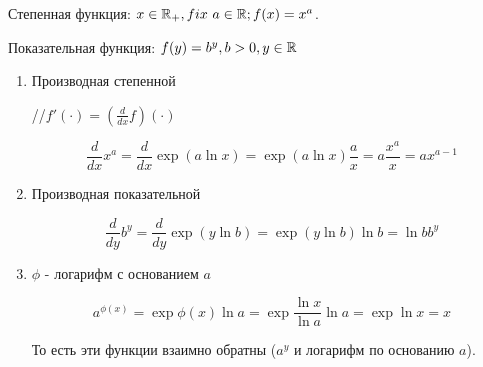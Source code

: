 \documentclass[12pt]{report}
\begin{document}
\begin{defn}
Степенная функция: $x \in \mathbb{R}_{+}, fix ~a \in \mathbb{R}; f(x) =  x^a$.

Показательная функция: $f(y) = b^y, b > 0, y \in \mathbb{R}$
\end{defn}

\begin{st}[Свойства]
\begin{enumerate}
\item Производная степенной

//$f'(\cdot) = \left(\frac{d}{dx} f\right)(\cdot)$

$$\frac{d}{dx}x^a = \frac{d}{dx}\exp(a\ln{x}) = \exp{(a\ln{x})} \frac{a}{x} = a\frac{x^a}{x} = ax^{a - 1}$$

\item Производная показательной

$$\frac{d}{dy}b^y = \frac{d}{dy}\exp(y\ln{b}) = \exp(y\ln{b})\ln{b} = \ln{b}b^y$$

\item $\phi$ - логарифм с основанием $a$

$$a^{\phi(x)} = \exp{\phi(x)\ln{a}} = \exp{\frac{\ln{x}}{\ln{a}}\ln{a}} = \exp{\ln{x}} = x$$

То есть эти функции взаимно обратны ($a^y$ и логарифм по основанию $a$).
\end{enumerate}
\end{st}
\end{document}
